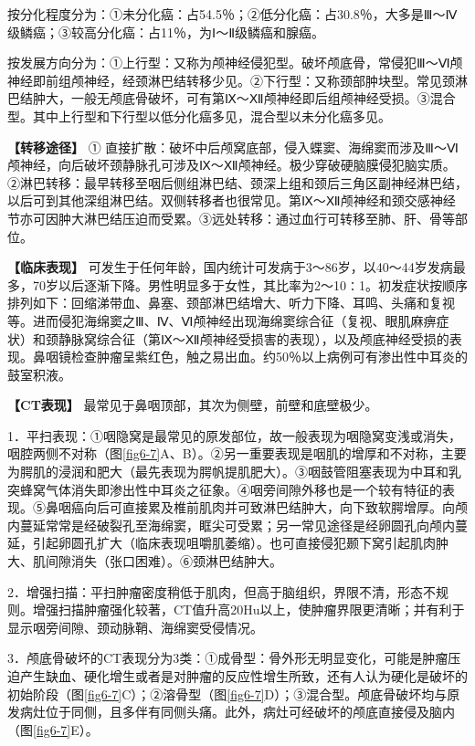 按分化程度分为：①未分化癌：占54.5％；②低分化癌：占30.8％，大多是Ⅲ～Ⅳ级鳞癌；③较高分化癌：占11％，为Ⅰ～Ⅱ级鳞癌和腺癌。

按发展方向分为：①上行型：又称为颅神经侵犯型。破坏颅底骨，常侵犯Ⅲ～Ⅵ颅神经即前组颅神经，经颈淋巴结转移少见。②下行型：又称颈部肿块型。常见颈淋巴结肿大，一般无颅底骨破坏，可有第Ⅸ～Ⅻ颅神经即后组颅神经受损。③混合型。其中上行型和下行型以低分化癌多见，混合型以未分化癌多见。

\textbf{【转移途径】} ①
直接扩散：破坏中后颅窝底部，侵入蝶窦、海绵窦而涉及Ⅲ～Ⅵ颅神经，向后破坏颈静脉孔可涉及Ⅸ～Ⅻ颅神经。极少穿破硬脑膜侵犯脑实质。②淋巴转移：最早转移至咽后侧组淋巴结、颈深上组和颈后三角区副神经淋巴结，以后可到其他深组淋巴结。双侧转移者也很常见。第Ⅸ～Ⅻ颅神经和颈交感神经节亦可因肿大淋巴结压迫而受累。③远处转移：通过血行可转移至肺、肝、骨等部位。

\textbf{【临床表现】}
可发生于任何年龄，国内统计可发病于3～86岁，以40～44岁发病最多，70岁以后逐渐下降。男性明显多于女性，其比率为2～10∶1。初发症状按顺序排列如下：回缩涕带血、鼻塞、颈部淋巴结增大、听力下降、耳鸣、头痛和复视等。进而侵犯海绵窦之Ⅲ、Ⅳ、Ⅵ颅神经出现海绵窦综合征（复视、眼肌麻痹症状）和颈静脉窝综合征（第Ⅸ～Ⅻ颅神经受损害的表现），以及颅底神经受损的表现。鼻咽镜检查肿瘤呈紫红色，触之易出血。约50％以上病例可有渗出性中耳炎的鼓室积液。

\textbf{【CT表现】} 最常见于鼻咽顶部，其次为侧壁，前壁和底壁极少。

1．平扫表现：①咽隐窝是最常见的原发部位，故一般表现为咽隐窝变浅或消失，咽腔两侧不对称（图\ref{fig6-7}A、B）。②另一重要表现是咽肌的增厚和不对称，主要为腭肌的浸润和肥大（最先表现为腭帆提肌肥大）。③咽鼓管阻塞表现为中耳和乳突蜂窝气体消失即渗出性中耳炎之征象。④咽旁间隙外移也是一个较有特征的表现。⑤鼻咽癌向后可直接累及椎前肌肉并可致淋巴结肿大，向下致软腭增厚。向颅内蔓延常常是经破裂孔至海绵窦，眶尖可受累；另一常见途径是经卵圆孔向颅内蔓延，引起卵圆孔扩大（临床表现咀嚼肌萎缩）。也可直接侵犯颞下窝引起肌肉肿大、肌间隙消失（张口困难）。⑥颈淋巴结肿大。

2．增强扫描：平扫肿瘤密度稍低于肌肉，但高于脑组织，界限不清，形态不规则。增强扫描肿瘤强化较著，CT值升高20Hu以上，使肿瘤界限更清晰；并有利于显示咽旁间隙、颈动脉鞘、海绵窦受侵情况。

3．颅底骨破坏的CT表现分为3类：①成骨型：骨外形无明显变化，可能是肿瘤压迫产生缺血、硬化增生或者是对肿瘤的反应性增生所致，还有人认为硬化是破坏的初始阶段（图\ref{fig6-7}C）；②溶骨型（图\ref{fig6-7}D）；③混合型。颅底骨破坏均与原发病灶位于同侧，且多伴有同侧头痛。此外，病灶可经破坏的颅底直接侵及脑内（图\ref{fig6-7}E）。



